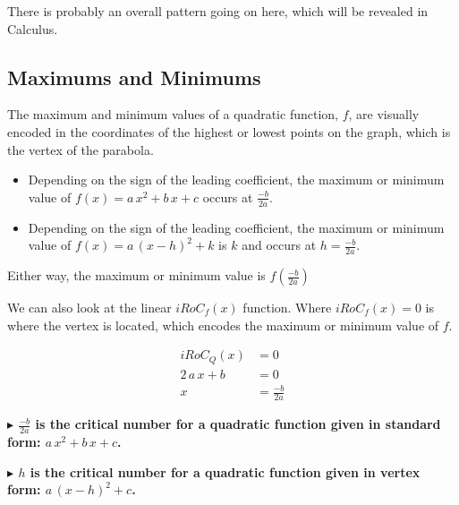 \documentclass{ximera}
\begin{document}
There is probably an overall pattern going on here, which will be revealed in Calculus. \\












\subsection*{Maximums and Minimums}




The maximum and minimum values of a quadratic function, $f$, are visually encoded in the coordinates of the highest or lowest points on the  graph, which is the vertex of the parabola.


\begin{itemize}
     \item Depending on the sign of the leading coefficient, the maximum or minimum value of $f(x) = a \, x^2 + b \, x + c$ occurs at $\frac{-b}{2a}$. 


     \item Depending on the sign of the leading coefficient, the maximum or minimum value of $f(x) = a \, (x - h)^2 + k$ is $k$ and occurs at $h = \frac{-b}{2a}$. 
\end{itemize}

Either way, the maximum or minimum value is $f\left( \frac{-b}{2a} \right)$




We can also look at the linear $iRoC_f(x)$ function.  Where $iRoC_f(x) = 0$ is where the vertex is located, which encodes the maximum or minimum value of $f$.





\begin{align*}
iRoC_Q(x)       &= 0  \\
2 \, a \, x + b  & = 0  \\
x     &=  \frac{-b}{2a}
\end{align*}




\textbf{\textcolor{blue!55!black}{$\blacktriangleright$ $\frac{-b}{2a}$ is the critical number for a quadratic function given in standard form: $a \, x^2 + b \, x + c$.}}  



\textbf{\textcolor{blue!55!black}{$\blacktriangleright$ $h$ is the critical number for a quadratic function given in vertex form: $a \, (x - h)^2 + c$.}}  
\end{document}
